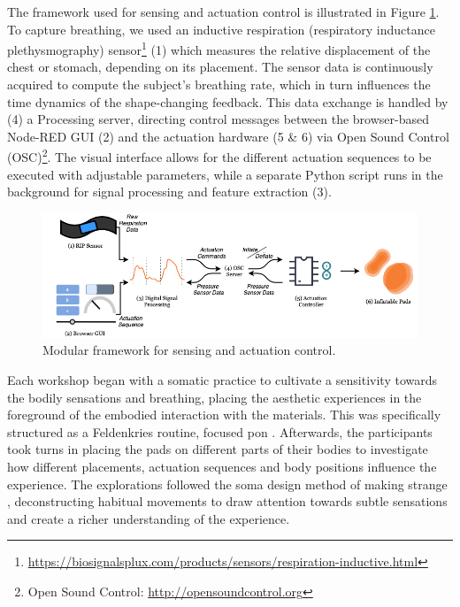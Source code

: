 The framework used for sensing and actuation control is illustrated in Figure \ref{fig:workflow}.
To capture breathing, we used an inductive respiration (respiratory inductance plethysmography) sensor\footnote{\url{https://biosignalsplux.com/products/sensors/respiration-inductive.html}} (1) which measures the relative displacement of the chest or stomach, depending on its placement. The sensor data is continuously acquired to compute the subject's breathing rate, which in turn influences the time dynamics of the shape-changing feedback. This data exchange is handled by (4) a Processing server, directing control messages between the browser-based Node-RED GUI (2) and the actuation hardware (5 \& 6) via Open Sound Control (OSC)\footnote{Open Sound Control:  \url{http://opensoundcontrol.org}}. The visual interface allows for the different actuation sequences to be executed with adjustable parameters, while a separate Python script runs in the background for signal processing and feature extraction (3).

\begin{figure}[t]
    \centering
    \includegraphics[width=1.0\linewidth]{Chapters/Figures/soma_chi/fig_2_framework.png}
    \caption{Modular framework for sensing and actuation control.}
    \label{fig:workflow}
\end{figure}


Each workshop began with a somatic practice to cultivate a sensitivity towards the bodily sensations and breathing, placing the aesthetic experiences in the foreground of the embodied interaction with the materials. This was specifically structured as a Feldenkries routine, focused pon . Afterwards, the participants took turns in placing the pads on different parts of their bodies to investigate how different placements, actuation sequences and body positions influence the experience. The explorations followed the soma design method of making strange \cite{loke_moving_2013}, deconstructing habitual movements to draw attention towards subtle sensations and create a richer understanding of the experience.

